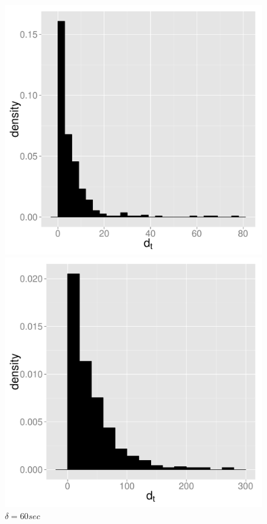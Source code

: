 \documentclass{wscpaperproc}
\theoremstyle{wsc}
\begin{document}
\begin{figure}[h]
\begin{minipage}[c]{.3\textwidth}
\end{minipage}

\begin{minipage}[c]{.3\textwidth}
\centering
    \includegraphics[scale=0.25]{40sec.pdf}
    \caption*{$\delta=40 sec$}

\end{minipage}
\hspace*{\fill} 
\begin{minipage}[c]{.3\textwidth}
\centering
    \includegraphics[scale=0.25]{60sec.pdf}
    \caption*{$\delta=60 sec$}


\end{minipage}
\end{figure}
\end{document}
